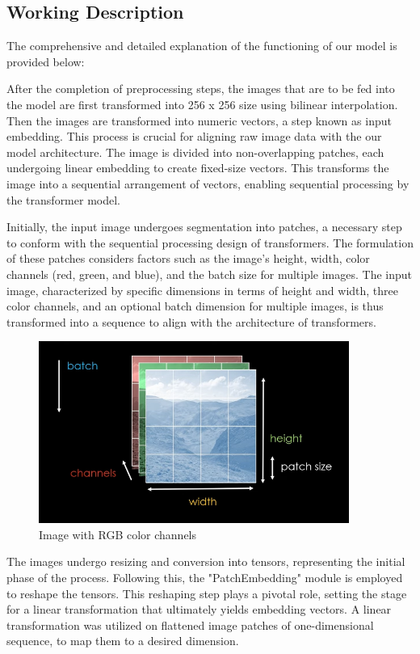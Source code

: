 \subsection{Working Description}

The comprehensive and detailed explanation of the functioning of our model is provided below:

\noindent After the completion of preprocessing steps, the images that are to be fed into the model are first transformed into  256 x 256 size using bilinear interpolation. Then the images are transformed into numeric vectors, a step known as input embedding. This process is crucial for aligning raw image data with the our model architecture. The image is divided into non-overlapping patches, each undergoing linear embedding to create fixed-size vectors. This transforms the image into a sequential arrangement of vectors, enabling sequential processing by the transformer model.

\noindent Initially, the input image undergoes segmentation into patches, a necessary step to conform with the sequential processing design of transformers. The formulation of these patches considers factors such as the image's height, width, color channels (red, green, and blue), and the batch size for multiple images. The input image, characterized by specific dimensions in terms of height and width, three color channels, and an optional batch dimension for multiple images, is thus transformed into a sequence to align with the architecture of transformers.\\
\begin{figure}[htbp]
    \centering
    \includegraphics[width=4in]{img/colorbatch.png}
    \caption{{Image with RGB color channels}}
\end{figure}

\noindent The images undergo resizing and conversion into tensors, representing the initial phase of the process. Following this, the "PatchEmbedding" module is employed to reshape the tensors. This reshaping step plays a pivotal role, setting the stage for a linear transformation that ultimately yields embedding vectors. A linear transformation was utilized on flattened image patches of one-dimensional sequence, to map them to a desired dimension.

